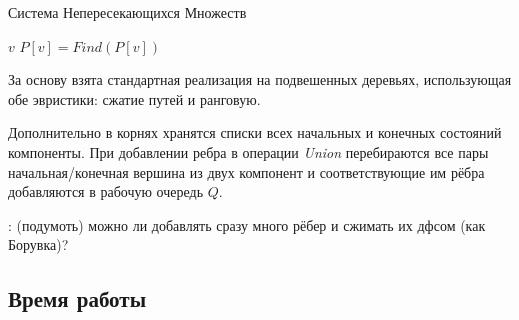 \begin{algorithm}[H]
  \begin{algorithmic}[1]
  \caption{Система Непересекающихся Множеств}
  \label{algo:DSU}
          \EndFor
          \EndFor
          \EndFor
      \EndFunction
              \Return $v$
          \EndIf
          \Return $P[v] = Find(P[v])$
      \EndFunction
              \Return
          \EndIf
          \EndIf
      \EndFunction
  \EndStructure
  \end{algorithmic}
\end{algorithm}

За основу взята стандартная реализация \cite{Hopcroft1973} на подвешенных деревьях, использующая обе эвристики: сжатие путей и ранговую. 


Дополнительно в корнях хранятся списки всех начальных и конечных состояний компоненты. При добавлении ребра в операции \textit{Union} перебираются все пары начальная/конечная вершина из двух компонент и соответствующие им рёбра добавляются в рабочую очередь $Q$. 

\TODO: (подумоть) можно ли добавлять сразу много рёбер и сжимать их дфсом (как Борувка)?

\subsection*{Время работы}

